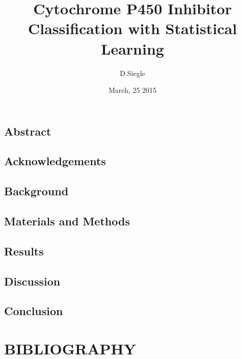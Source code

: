 \documentclass[12pt]{report}
\author{D.Siegle}
\title{Cytochrome P450 Inhibitor Classification with Statistical Learning}
\date{March, 25 2015}
\begin{document}


\chapter*{Abstract}


\tableofcontents
{}
\listoftables
{}
\listoffigures

\begin{doublespacing}

\chapter*{Acknowledgements}


\chapter{Background}



\chapter{Materials and Methods}


\chapter{Results}
\thispagestyle{empty}




\chapter{Discussion}


\chapter{Conclusion}


\end{doublespacing}

\part*{BIBLIOGRAPHY}
\setcounter{page}{1}

{}

\end{document}
